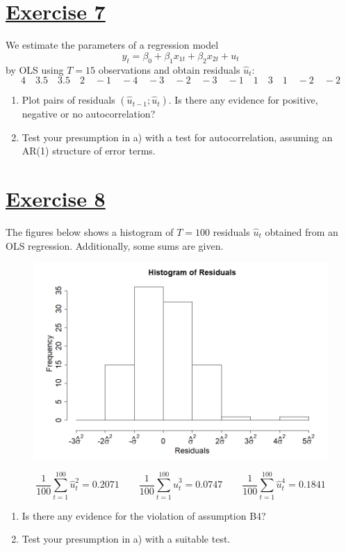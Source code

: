 \documentclass[captions=tableheading, 12pt, headings=small, parskip=half]{scrartcl}
\begin{document}
\section*{\underline{Exercise 7}}

We estimate the parameters of a regression model
\[
	y_t = \beta_0 + \beta_1x_{1t} + \beta_2 x_{2t} + u_t 
\]by OLS using $T=15$ observations and obtain residuals $\hat{u}_t$:
\[
	4\quad3.5\quad3.5\quad2\quad-1\quad-4\quad-3\quad-2\quad-3\quad-1\quad1\quad3\quad1\quad-2\quad-2
\]
\begin{enumerate}[label = \alph*)]
	\item Plot pairs of residuals $(\hat{u}_{t-1};\hat{u}_t)$. Is there any evidence for positive, negative or no autocorrelation?
	\item Test your presumption in a) with a test for autocorrelation, assuming an AR(1) structure of error terms.
\end{enumerate}

\section*{\underline{Exercise 8}}
The figures below shows a histogram of $T=100$ residuals $\hat{u}_t$ obtained from an OLS regression. Additionally, some sums are given.
\begin{figure}[H]
	\centering
	\includegraphics[width = 0.7\columnwidth]{Code2/hist8.png}
\end{figure}
\[
\frac{1}{100}\sum_{t = 1}^{100}{\hat{u}_t^2} = 0.2071 \qquad \frac{1}{100}\sum_{t = 1}^{100}{\hat{u}_t^3} = 0.0747 \qquad \frac{1}{100}\sum_{t = 1}^{100}{\hat{u}_t^4} = 0.1841
\]

\begin{enumerate}[label = \alph*)]
	\item Is there any evidence for the violation of assumption B4?
	\item Test your presumption in a) with a suitable test.
\end{enumerate}
\end{document}
